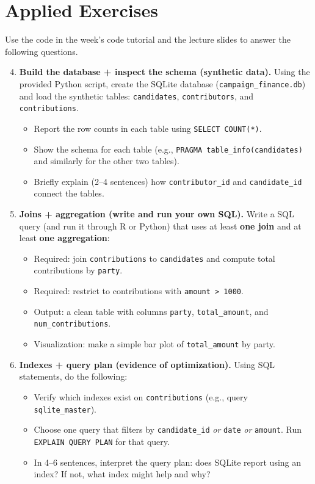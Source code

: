 \documentclass[11pt]{article}
\begin{document}
\section*{Applied Exercises}
Use the code in the week's code tutorial and the lecture slides to answer the following questions.\bigskip

  \begin{enumerate}
\setcounter{enumi}{3}

\item \textbf{Build the database + inspect the schema (synthetic data).}
Using the provided Python script, create the SQLite database (\texttt{campaign\_finance.db}) and load the synthetic tables:
\texttt{candidates}, \texttt{contributors}, and \texttt{contributions}.
\begin{itemize}
  \item Report the row counts in each table using \texttt{SELECT COUNT(*)}.
  \item Show the schema for each table (e.g., \texttt{PRAGMA table\_info(candidates)} and similarly for the other two tables).
  \item Briefly explain (2--4 sentences) how \texttt{contributor\_id} and \texttt{candidate\_id} connect the tables.
\end{itemize}

\item \textbf{Joins + aggregation (write and run your own SQL).}
Write a SQL query (and run it through R or Python) that uses at least \textbf{one join} and at least \textbf{one aggregation}:
\begin{itemize}
  \item Required: join \texttt{contributions} to \texttt{candidates} and compute total contributions by \texttt{party}.
  \item Required: restrict to contributions with \texttt{amount > 1000}.
  \item Output: a clean table with columns \texttt{party}, \texttt{total\_amount}, and \texttt{num\_contributions}.
  \item Visualization: make a simple bar plot of \texttt{total\_amount} by party.
\end{itemize}

\item \textbf{Indexes + query plan (evidence of optimization).}
Using SQL statements, do the following:
\begin{itemize}
  \item Verify which indexes exist on \texttt{contributions} (e.g., query \texttt{sqlite\_master}).
  \item Choose one query that filters by \texttt{candidate\_id} \emph{or} \texttt{date} \emph{or} \texttt{amount}. Run \texttt{EXPLAIN QUERY PLAN} for that query.
  \item In 4--6 sentences, interpret the query plan: does SQLite report using an index? If not, what index might help and why?
\end{itemize}


\end{enumerate}
\end{document}
